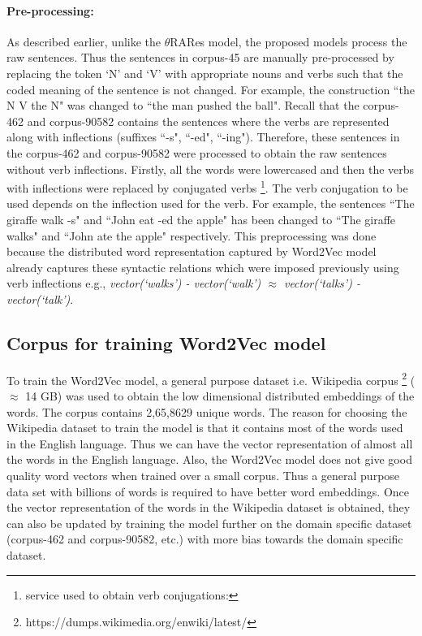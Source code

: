 \paragraph{Pre-processing:} As described earlier, unlike the  $\theta$RARes model, the proposed models process the raw sentences. Thus the sentences in corpus-45 are manually pre-processed by replacing the token `N' and `V' with appropriate nouns and verbs such that the coded meaning of the sentence is not changed. For example, the construction ``the N V the N" was changed to ``the man pushed the ball". Recall that the corpus-462 and corpus-90582 contains the sentences where the verbs are represented along with inflections (suffixes ``-s", ``-ed", ``-ing"). Therefore, these sentences in the corpus-462 and corpus-90582 were processed to obtain the raw sentences without verb inflections. Firstly, all the words were lowercased and then the verbs with inflections were replaced by conjugated verbs \footnote{service used to obtain verb conjugations: }. The verb conjugation to be used depends on the inflection used for the verb. For example, the sentences ``The giraffe walk -s" and ``John eat -ed the apple" has been changed to ``The giraffe walks" and ``John ate the apple" respectively. This preprocessing was done because the distributed word representation captured by Word2Vec model already captures these syntactic relations which were imposed previously using verb inflections e.g., \textit{vector(`walks') - vector(`walk') $\approx$ vector(`talks') - vector(`talk')}. 
 
\subsection{Corpus for training Word2Vec model}

To train the Word2Vec model, a general purpose dataset i.e. Wikipedia corpus \footnote{https://dumps.wikimedia.org/enwiki/latest/} ($\approx$ 14 GB) was used to obtain the low dimensional distributed embeddings of the words. The corpus contains 2,65,8629 unique words. The reason for choosing the Wikipedia dataset to train the model is that it contains most of the words used in the English language. Thus we can have the vector representation of almost all the words in the English language. Also, the Word2Vec model does not give good quality word vectors when trained over a small corpus. Thus a general purpose data set with billions of words is required to have better word embeddings. Once the vector representation of the words in the Wikipedia dataset is obtained, they can also be updated by training the model further on the domain specific dataset (corpus-462 and corpus-90582, etc.) with more bias towards the domain specific dataset. 

